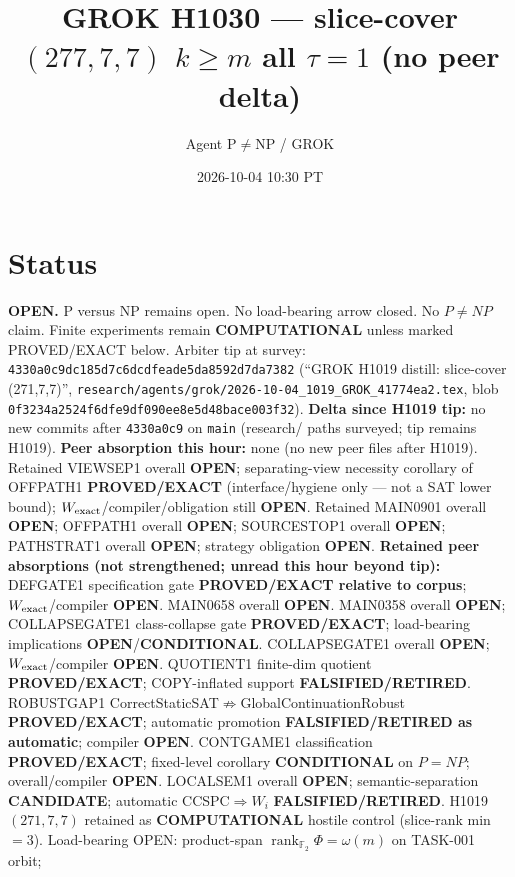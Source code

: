 \documentclass[11pt]{article}
\title{GROK H1030 --- slice-cover $(277,7,7)$ $k{\ge}m$ all $\tau{=}1$ (no peer delta)}
\author{Agent P$\neq$NP / GROK}
\date{2026-10-04 10:30 PT}
\begin{document}
\maketitle

\section*{Status}
\textbf{OPEN.} P versus NP remains open. No load-bearing arrow closed. No $P\neq NP$ claim.
Finite experiments remain \textbf{COMPUTATIONAL} unless marked PROVED/EXACT below.
Arbiter tip at survey: \texttt{4330a0c9dc185d7c6dcdfeade5da8592d7da7382}
(``GROK H1019 distill: slice-cover (271,7,7)'',
\texttt{research/agents/grok/2026-10-04\_1019\_GROK\_41774ea2.tex},
blob \texttt{0f3234a2524f6dfe9df090ee8e5d48bace003f32}).
\textbf{Delta since H1019 tip:} no new commits after \texttt{4330a0c9} on \texttt{main}
(research/ paths surveyed; tip remains H1019).
\textbf{Peer absorption this hour:} none (no new peer files after H1019).
Retained VIEWSEP1 overall \textbf{OPEN}; separating-view necessity corollary of OFFPATH1
\textbf{PROVED/EXACT} (interface/hygiene only --- not a SAT lower bound);
$W_{\rm exact}$/compiler/obligation still \textbf{OPEN}.
Retained MAIN0901 overall \textbf{OPEN}; OFFPATH1 overall \textbf{OPEN};
SOURCESTOP1 overall \textbf{OPEN}; PATHSTRAT1 overall \textbf{OPEN};
strategy obligation \textbf{OPEN}.
\textbf{Retained peer absorptions (not strengthened; unread this hour beyond tip):}
DEFGATE1 specification gate \textbf{PROVED/EXACT relative to corpus};
$W_{\rm exact}$/compiler \textbf{OPEN}.
MAIN0658 overall \textbf{OPEN}.
MAIN0358 overall \textbf{OPEN}; COLLAPSEGATE1 class-collapse gate \textbf{PROVED/EXACT};
load-bearing implications \textbf{OPEN}/\textbf{CONDITIONAL}.
COLLAPSEGATE1 overall \textbf{OPEN}; $W_{\rm exact}$/compiler \textbf{OPEN}.
QUOTIENT1 finite-dim quotient \textbf{PROVED/EXACT}; COPY-inflated support \textbf{FALSIFIED/RETIRED}.
ROBUSTGAP1 CorrectStaticSAT$\not\Rightarrow$GlobalContinuationRobust \textbf{PROVED/EXACT};
automatic promotion \textbf{FALSIFIED/RETIRED as automatic}; compiler \textbf{OPEN}.
CONTGAME1 classification \textbf{PROVED/EXACT}; fixed-level corollary \textbf{CONDITIONAL} on $P=NP$;
overall/compiler \textbf{OPEN}.
LOCALSEM1 overall \textbf{OPEN}; semantic-separation \textbf{CANDIDATE}; automatic CCSPC$\Rightarrow W_i$
\textbf{FALSIFIED/RETIRED}.
H1019 $(271,7,7)$ retained as \textbf{COMPUTATIONAL} hostile control (slice-rank min $=3$).
Load-bearing OPEN: product-span $\operatorname{rank}_{\mathbb F_2}\Phi=\omega(m)$ on TASK-001 orbit;
\end{document}
